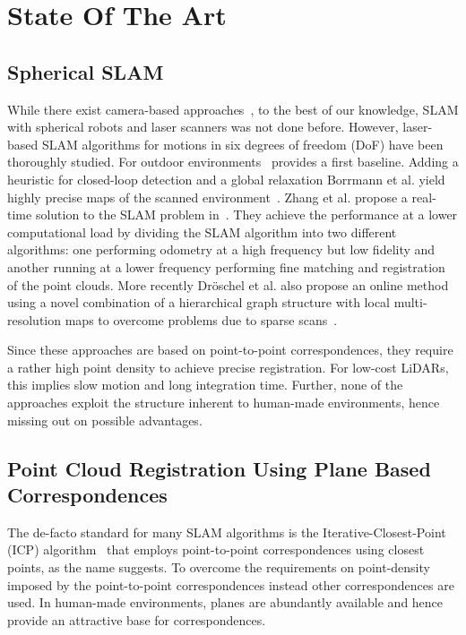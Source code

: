 \section{State Of The Art}

\subsection{Spherical SLAM}

While there exist camera-based approaches~\cite{9233654}, to the best of our knowledge, SLAM with spherical robots and laser scanners was not done before.
However, laser-based SLAM algorithms for motions in six degrees of freedom (DoF) have been thoroughly studied.
For outdoor environments~\cite{JFR2006} provides a first baseline.
Adding a heuristic for closed-loop detection and a global relaxation Borrmann et al. yield highly precise maps of the scanned environment~\cite{RAS2007}.
Zhang et al. propose a real-time solution to the SLAM problem in~\cite{Zhang2014}.
They achieve the performance at a lower computational load by dividing the SLAM algorithm into two different algorithms: one performing odometry at a high frequency but low fidelity and another running at a lower frequency performing fine matching and registration of the point clouds.
More recently Dröschel et al. also propose an online method using a novel combination of a hierarchical graph structure with local multi-resolution maps to overcome problems due to sparse scans~\cite{Droeschel2018}.

Since these approaches are based on point-to-point correspondences, they require a rather high point density to achieve precise registration.
For low-cost LiDARs, this implies slow motion and long integration time.
Further, none of the approaches exploit the structure inherent to human-made environments, hence missing out on possible advantages.

\subsection{Point Cloud Registration Using Plane Based Correspondences}

The de-facto standard for many SLAM algorithms is the Iterative-Closest-Point (ICP) algorithm~\cite{Besl1992} that employs point-to-point correspondences using closest points, as the name suggests. 
To overcome the requirements on point-density imposed by the point-to-point correspondences instead other correspondences are used. 
In human-made environments, planes are abundantly available and hence provide an attractive base for correspondences.

